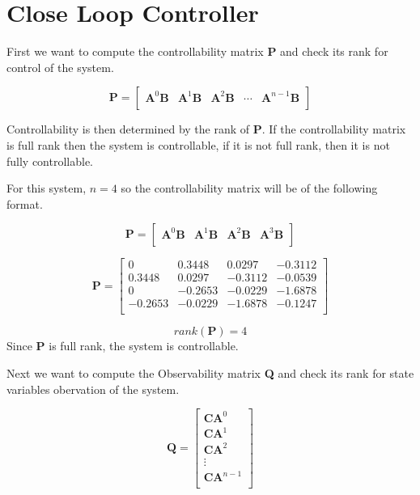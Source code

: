 \documentclass[titlepage]{article}
\begin{document}
\newpage
\section{Close Loop Controller}
	First we want to compute the controllability matrix \textbf{P} and check its rank for control of the system.

	\[\textbf{P} = \begin{bmatrix}
		\textbf{A}^{0}\textbf{B} & \textbf{A}^{1}\textbf{B} & \textbf{A}^{2}\textbf{B} & \cdots & \textbf{A}^{n-1}\textbf{B}\\
	\end{bmatrix}\]

	Controllability is then determined by the rank of \textbf{P}. If the controllability matrix is full rank then the system is controllable, if it is not full rank, then it is not fully controllable.

	For this system, \(n=4\) so the controllability matrix will be of the following format.

	\[\textbf{P} = \begin{bmatrix}
		\textbf{A}^{0}\textbf{B} & \textbf{A}^{1}\textbf{B} & \textbf{A}^{2}\textbf{B}& \textbf{A}^{3}\textbf{B}\\
		\end{bmatrix}\]

	\[\textbf{P} =
	\begin{bmatrix}
		0 & 0.3448 & 0.0297 & -0.3112\\
		0.3448 & 0.0297 & -0.3112 & -0.0539\\
		0 & -0.2653& -0.0229 & -1.6878\\
		-0.2653 & -0.0229 & -1.6878 & -0.1247\\
	\end{bmatrix}\]

	\[rank\left(\textbf{P}\right) = 4\]
	Since \textbf{P} is full rank, the system is controllable.

	Next we want to compute the Observability matrix \textbf{Q} and check its rank for state variables obervation of the system.

	\[\textbf{Q} = \begin{bmatrix}
		\textbf{C}\textbf{A}^{0}\\
		\textbf{C}\textbf{A}^{1}\\
		\textbf{C}\textbf{A}^{2}\\
		\vdots\\
		\textbf{C}\textbf{A}^{n-1}\\
	\end{bmatrix}\]
\end{document}
